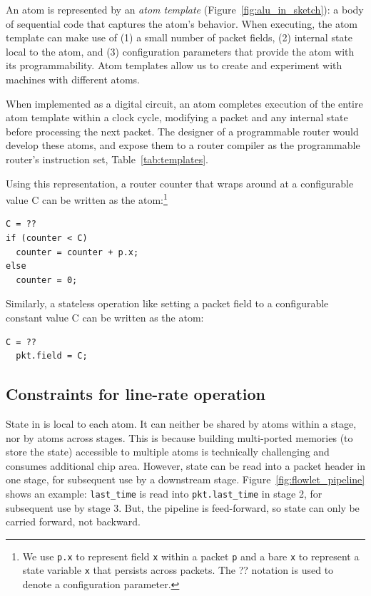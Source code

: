 An atom is represented by an {\em atom template}
(Figure~\ref{fig:alu_in_sketch}): a body of sequential code that captures the
atom's behavior. When executing, the atom template can make use of (1) a small
number of packet fields, (2) internal state local to the atom, and (3)
configuration parameters that provide the atom with its programmability. Atom
templates allow us to create and experiment with \absmachine machines with
different atoms.

When implemented as a digital circuit, an atom completes execution of the entire
atom template within a clock cycle, modifying a packet and any internal
state before processing the next packet. The designer of a programmable router
would develop these atoms, and expose them to a router compiler as the
programmable router's instruction set, \eg Table~\ref{tab:templates}.

Using this representation, a router counter that wraps around at a configurable
value C can be written as the atom:\footnote{We use {\tt p.x} to represent
field {\tt x} within a packet {\tt p} and a bare {\tt x} to represent a state
variable {\tt x} that persists across packets. The ?? notation is used to
denote a configuration parameter.}
\begin{lstlisting}[style=customc, numbers=none, frame=none]
C = ??
if (counter < C)
  counter = counter + p.x;
else
  counter = 0;
\end{lstlisting}

Similarly, a stateless operation like setting a packet field to a configurable
constant value C can be written as the atom:
\begin{lstlisting}[style=customc, numbers=none, frame=none]
  C = ??
  pkt.field = C;
\end{lstlisting}

\subsection{Constraints for line-rate operation}
\label{s:atomConstraints}

 State in \absmachine is local to each atom.  It can
neither be shared by atoms within a stage, nor by atoms across stages. This is
because building multi-ported memories (to store the state) accessible to
multiple atoms is technically challenging and consumes additional chip area.
However, state can be read into a packet header in one stage, for subsequent
use by a downstream stage. Figure~\ref{fig:flowlet_pipeline} shows an example:
{\tt last\_time} is read into {\tt pkt.last\_time} in stage 2, for subsequent
use by stage 3.  But, the \absmachine pipeline is feed-forward, so state can
only be carried forward, not backward.

